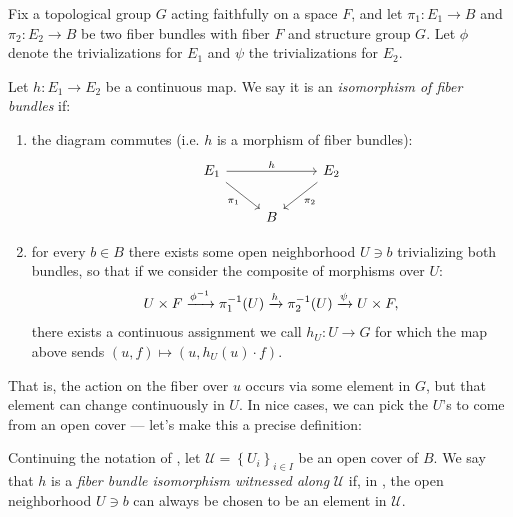 \documentclass[11pt]{book}
\begin{document}
\begin{definition}\label{def:isomorphism-of-fiber-bundles} 
Fix a topological group $G$ acting faithfully on a space $F$, and let $\pi_1 \colon E_1 \to B$ and $\pi_2 \colon E_2 \to B$ be two fiber bundles with fiber $F$ and structure group $G$. Let $\phi$ denote the trivializations for $E_1$ and $\psi$ the trivializations for $E_2$.

Let $h \colon E_1 \to E_2$ be a continuous map. We say it is an \emph{isomorphism of fiber bundles} if:
\begin{enumerate}
    \item the diagram commutes (i.e. $h$ is a morphism of fiber bundles):
\[ \begin{tikzcd}
    E_1\ar[rr,"h" above]\ar[dr,"\pi_1" below left]&  & E_2\ar[dl,"\pi_2" below right]\\
     & B & 
\end{tikzcd} \]
    \item for every $b\in B$ there exists some open neighborhood $U \ni b$ trivializing both bundles, so that if we consider the composite of morphisms over $U$:
    \begin{equation}\label{eqn:hU-fiber-bundle-morphism}
    \begin{aligned}
        U \times F \xrightarrow{\phi^{-1}} \pi_1^{-1}(U) \xrightarrow{h} \pi_2^{-1}(U) \xrightarrow{\psi} U \times F,
    \end{aligned}
    \end{equation}
    there exists a continuous assignment we call $h_U \colon U \to G$ for which the map above sends $(u,f) \mapsto (u, h_U(u)\cdot f)$.
\end{enumerate}
\end{definition}

That is, the action on the fiber over $u$ occurs via some element in $G$, but that element can change continuously in $U$. In nice cases, we can pick the $U$'s to come from an open cover --- let's make this a precise definition:
\begin{definition}\label{def:iso-fiber-bundle-witnessed-along-cover} Continuing the notation of , let $\mathcal{U} = \left\{ U_i \right\}_{i\in I}$ be an open cover of $B$. We say that $h$ is a \emph{fiber bundle isomorphism witnessed along} $\mathcal{U}$ if, in , the open neighborhood $U\ni b$ can always be chosen to be an element in $\mathcal{U}$.
\end{definition}
\end{document}
